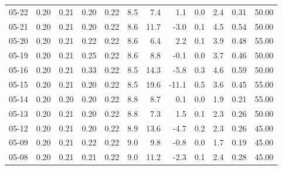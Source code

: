 \begin{threeparttable}
{\begin{tabular}{lrrrrrrrrrrr}
  05-22 &          0.20 &          0.21 &          0.20 &        0.22 &                 8.5 &                 7.4 &        1.1 &                 0.0 &              2.4 &            0.31 &                  50.00 \\
  05-21 &          0.20 &          0.21 &          0.20 &        0.22 &                 8.6 &                11.7 &       -3.0 &                 0.1 &              4.5 &            0.54 &                  50.00 \\
  05-20 &          0.20 &          0.21 &          0.22 &        0.22 &                 8.6 &                 6.4 &        2.2 &                 0.1 &              3.9 &            0.48 &                  55.00 \\
  05-19 &          0.20 &          0.21 &          0.25 &        0.22 &                 8.6 &                 8.8 &       -0.1 &                 0.0 &              3.7 &            0.46 &                  50.00 \\
  05-16 &          0.20 &          0.21 &          0.33 &        0.22 &                 8.5 &                14.3 &       -5.8 &                 0.3 &              4.6 &            0.59 &                  50.00 \\
  05-15 &          0.20 &          0.21 &          0.20 &        0.22 &                 8.5 &                19.6 &      -11.1 &                 0.5 &              3.6 &            0.45 &                  55.00 \\
  05-14 &          0.20 &          0.20 &          0.20 &        0.22 &                 8.8 &                 8.7 &        0.1 &                 0.0 &              1.9 &            0.21 &                  55.00 \\
  05-13 &          0.20 &          0.21 &          0.20 &        0.22 &                 8.8 &                 7.3 &        1.5 &                 0.1 &              2.3 &            0.26 &                  50.00 \\
  05-12 &          0.20 &          0.21 &          0.20 &        0.22 &                 8.9 &                13.6 &       -4.7 &                 0.2 &              2.3 &            0.26 &                  45.00 \\
  05-09 &          0.20 &          0.21 &          0.22 &        0.22 &                 9.0 &                 9.8 &       -0.8 &                 0.0 &              1.7 &            0.19 &                  45.00 \\
  05-08 &          0.20 &          0.21 &          0.21 &        0.22 &                 9.0 &                11.2 &       -2.3 &                 0.1 &              2.4 &            0.28 &                  45.00 \\

\end{tabular}}
\end{threeparttable}
